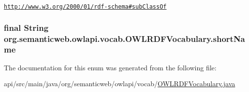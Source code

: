 \href{http://www.w3.org/2000/01/rdf-schema#subClassOf}{\tt http\-://www.\-w3.\-org/2000/01/rdf-\/schema\#sub\-Class\-Of} \hypertarget{enumorg_1_1semanticweb_1_1owlapi_1_1vocab_1_1_o_w_l_r_d_f_vocabulary_a57d3a21e4214cca32546506ea3a5c750}{
\subsubsection[{short\-Name}]{\setlength{\rightskip}{0pt plus 5cm}final String org.\-semanticweb.\-owlapi.\-vocab.\-O\-W\-L\-R\-D\-F\-Vocabulary.\-short\-Name}}\label{enumorg_1_1semanticweb_1_1owlapi_1_1vocab_1_1_o_w_l_r_d_f_vocabulary_a57d3a21e4214cca32546506ea3a5c750}


The documentation for this enum was generated from the following file\-:\begin{DoxyCompactItemize}
\item 
api/src/main/java/org/semanticweb/owlapi/vocab/\hyperlink{_o_w_l_r_d_f_vocabulary_8java}{O\-W\-L\-R\-D\-F\-Vocabulary.\-java}\end{DoxyCompactItemize}
